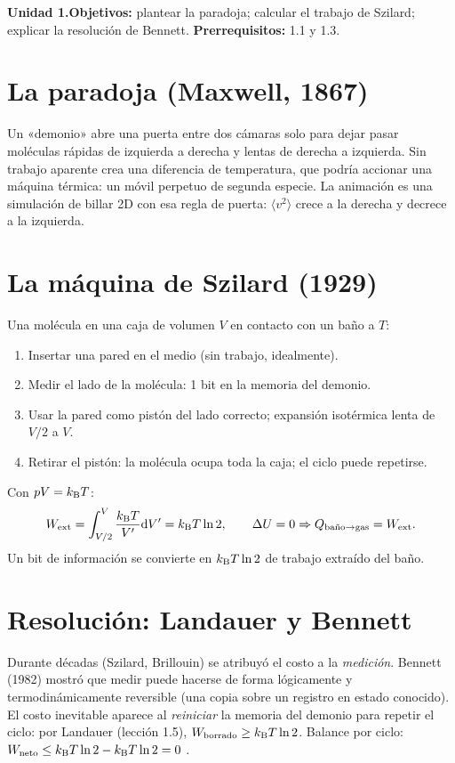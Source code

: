 \documentclass[11pt,a4paper]{article}
\begin{document}

\noindent\textbf{Unidad 1.}\quad\textbf{Objetivos:} plantear la paradoja; calcular el trabajo de Szilard; explicar la
resolución de Bennett. \textbf{Prerrequisitos:} 1.1 y 1.3.

\section{La paradoja (Maxwell, 1867)}
Un «demonio» abre una puerta entre dos cámaras solo para dejar pasar moléculas rápidas de izquierda a derecha y lentas
de derecha a izquierda. Sin trabajo aparente crea una diferencia de temperatura, que podría accionar una máquina
térmica: un móvil perpetuo de segunda especie. La animación es una simulación de billar 2D \evS{} con esa regla de
puerta: $\langle v^2\rangle$ crece a la derecha y decrece a la izquierda.

\section{La máquina de Szilard (1929)}
Una molécula en una caja de volumen $V$ en contacto con un baño a $T$:
\begin{enumerate}[nosep]
\item Insertar una pared en el medio (sin trabajo, idealmente).
\item Medir el lado de la molécula: 1 bit en la memoria del demonio.
\item Usar la pared como pistón del lado correcto; expansión isotérmica lenta de $V/2$ a $V$.
\item Retirar el pistón: la molécula ocupa toda la caja; el ciclo puede repetirse.
\end{enumerate}
Con $pV=k_{\mathrm B} T$:
\begin{equation}W_{\text{ext}}=\int_{V/2}^{V}\frac{k_{\mathrm B} T}{V'}\mathrm{d} V'=k_{\mathrm B} T\ln2,\qquad\Delta U=0\Rightarrow Q_{\text{baño}\to\text{gas}}=W_{\text{ext}}.\end{equation}
Un bit de información se convierte en $k_{\mathrm B} T\ln2$ de trabajo extraído del baño.

\section{Resolución: Landauer y Bennett}
Durante décadas (Szilard, Brillouin) se atribuyó el costo a la \emph{medición}. Bennett (1982) mostró que medir puede
hacerse de forma lógicamente y termodinámicamente reversible (una copia sobre un registro en estado conocido). El costo
inevitable aparece al \emph{reiniciar} la memoria del demonio para repetir el ciclo: por Landauer (lección 1.5),
$W_{\text{borrado}}\ge k_{\mathrm B} T\ln2$. Balance por ciclo: $W_{\text{neto}}\le k_{\mathrm B} T\ln2-k_{\mathrm B} T\ln2=0$ \cite{bennett}.
\end{document}
